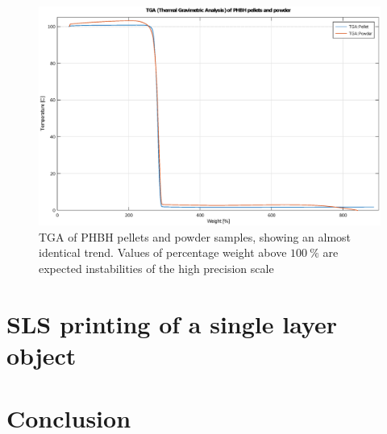 \documentclass{article}
\begin{document}
                \begin{figure}[h!]
                    \centering 
                    \includegraphics[width=\textwidth]{Pictures/Thermal_analysis_plots/TGA.eps}
                    \caption{TGA of PHBH pellets and powder samples, showing an almost identical trend. Values of percentage 
                    weight above $100 \ \%$ are expected instabilities of the high precision scale}
                    \label{fig:TGA_plot}
                \end{figure}

    \clearpage
    \section{SLS printing of a single layer object}

    \clearpage
    \section{Conclusion}

    

    
    
    











    \clearpage

    \printbibliography
\end{document}
